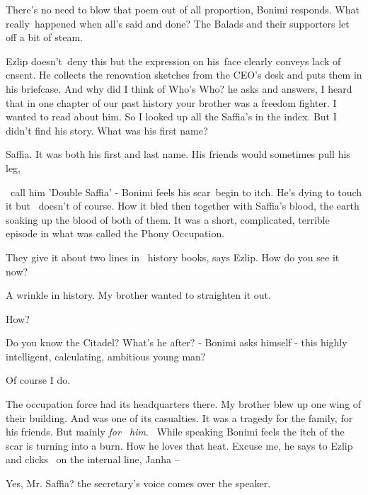 \documentclass[12pt]{book}
\begin{document}
{\textquotedbl}There's no need to blow that poem out of all proportion,{\textquotedbl} Bonimi responds.
{\textquotedbl}What really~happened when all's said and done? The Balads and their supporters let off a bit of
steam.{\textquotedbl}

Ezlip doesn't~deny this but the expression on his~face clearly conveys lack of cnsent. He collects the renovation
sketches from the CEO's desk and puts them in his briefcase. {\textquotedbl}And why did I think of Who's
Who?{\textquotedbl} he asks and answers, {\textquotedbl}I heard that in one chapter of our past history your brother
was a freedom fighter. I wanted to read about him. So I looked up all the Saffia's in the index. But I didn't find his
story. What was his first name?{\textquotedbl}~

{\textquotedbl}Saffia. It was both his first and last name. His friends would sometimes pull his leg,

\ call him 'Double Saffia' -{\textquotedbl} Bonimi feels his scar~begin to itch. He's dying to touch it but \ doesn't of
course. How it bled then together with Saffia's blood, the earth soaking up the blood of both of them.
{\textquotedbl}It was a short, complicated, terrible episode in what was called the Phony Occupation.{\textquotedbl}

{\textquotedbl}They give it about two lines in \ history books,{\textquotedbl} says Ezlip. {\textquotedbl}How do you see
it now?{\textquotedbl}

{\textquotedbl}A wrinkle in history. My brother wanted to straighten it out.{\textquotedbl}

{\textquotedbl}How?{\textquotedbl}

{\textquotedbl}Do you know the Citadel?{\textquotedbl} What's he after? - Bonimi asks himself - this highly intelligent,
calculating, ambitious young man?

{\textquotedbl}Of course I do.{\textquotedbl}

{\textquotedbl}The occupation force had its headquarters there. My brother blew up one wing of their building. And was
one of its casualties. It was a tragedy for the family, for his friends. But mainly \textit{for \ him}.{\textquotedbl}
\ While speaking Bonimi feels the itch of the scar is turning into a burn. How he loves that heat.
{\textquotedbl}Excuse me,{\textquotedbl} he says to Ezlip and clicks \ on the internal line, {\textquotedbl}Janha --
{\textquotedbl}

{\textquotedbl}Yes, Mr. Saffia?{\textquotedbl} the secretary's voice comes over the speaker.
\end{document}
